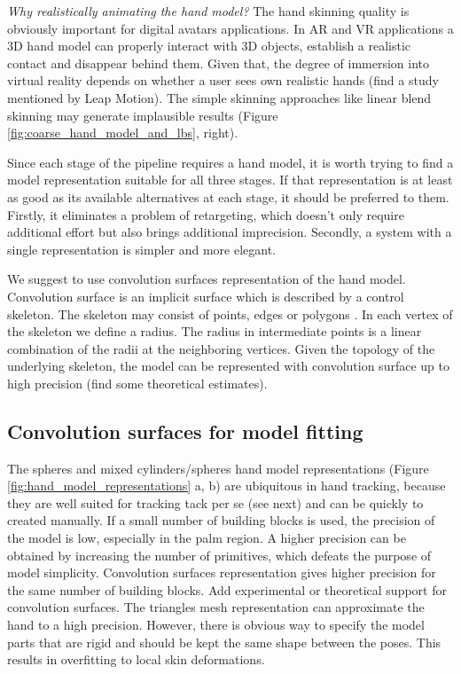 \documentclass[10pt,journal,a4paper]{IEEEtran}
\begin{document}
\textit{Why realistically animating the hand model?}
The hand skinning quality is obviously important for digital avatars applications. In AR and VR applications a 3D hand model can properly interact with 3D objects, establish a realistic contact and disappear behind them. Given that, the degree of immersion into virtual reality depends on whether a user sees own realistic hands \textcolor{mygray}{(find a study mentioned by Leap Motion).} The simple skinning approaches like linear blend skinning may generate implausible results  (Figure \ref{fig:coarse_hand_model_and_lbs}, right).

Since each stage of the pipeline requires a hand model, it is worth trying to find a model representation suitable for all three stages.  If that representation is at least as good as its available alternatives at each stage, it should be preferred to them. Firstly, it eliminates a problem of retargeting, which doesn't only require additional effort but also brings additional imprecision. \textcolor{mygray}{Secondly, a system with a single representation is simpler and more elegant.}

We suggest to use convolution surfaces representation of the hand model. Convolution surface is an implicit surface which is described by a control skeleton. The skeleton may consist of points, edges or polygons \cite{bloomenthal1991convolution}. In each vertex of the skeleton we define a radius. The radius in intermediate points is a linear combination of the radii at the neighboring vertices. Given the topology of the underlying skeleton, the model can be represented with convolution surface up to high precision \textcolor{mygray}{(find some theoretical estimates).}


\subsection{Convolution surfaces for model fitting}
The spheres and mixed cylinders/spheres hand model representations (Figure \ref{fig:hand_model_representations} a, b) are ubiquitous in hand tracking, because they are well suited for tracking tack per se (see next) and can be quickly to created manually. If a small number of  building blocks is used, the precision of the model is low, especially in the palm region. A higher precision can be obtained by increasing the number of primitives, which defeats the purpose of model simplicity. Convolution surfaces representation gives higher precision for the same number of building blocks. \textcolor{mygray}{Add experimental or theoretical support for convolution surfaces.}
The triangles mesh representation can approximate the hand to a high precision. However, there is obvious way to specify the model parts that are rigid and should be kept the same shape between the poses. This results in overfitting to local skin deformations. 
\end{document}
